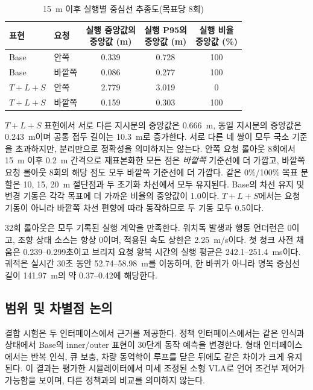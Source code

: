 \documentclass[letterpaper,conference]{IEEEtran}
\begin{document}
\begin{table}[!ht]
\caption{15~m 이후 실행별 중심선 추종도(목표당 8회)}
\label{tab:adherence}
\centering
\footnotesize
\setlength{\tabcolsep}{3.1pt}
\begin{tabular}{@{}llccc@{}}
\toprule
표현 & 요청 & \shortstack{실행 중앙값의\\중앙값 (m)} & \shortstack{실행 P95의\\중앙값 (m)} & \shortstack{실행 비율\\중앙값 (\%)} \\
\midrule
Base & 안쪽 & 0.339 & 0.728 & 100 \\
Base & 바깥쪽 & 0.086 & 0.277 & 100 \\
$T{+}L{+}S$ & 안쪽 & 2.779 & 3.019 & 0 \\
$T{+}L{+}S$ & 바깥쪽 & 0.159 & 0.303 & 100 \\
\bottomrule
\end{tabular}
\end{table}

$T{+}L{+}S$ 표현에서 서로 다른 지시문의 중앙값은 0.666~m, 동일 지시문의 중앙값은
0.243~m이며 공통 접두 길이는 10.3~m로 증가한다. 서로 다른 네 쌍이 모두 국소 기준을
초과하지만, 분리만으로 정확성을 의미하지는 않는다. 안쪽 요청 롤아웃 8회에서 15~m
이후 0.2~m 간격으로 재표본화한 모든 점은 \emph{바깥쪽} 기준선에 더 가깝고, 바깥쪽
요청 롤아웃 8회의 해당 점도 모두 바깥쪽 기준선에 더 가깝다. 같은 0\%/100\% 목표
분할은 10, 15, 20~m 절단점과 두 초기화 차선에서 모두 유지된다. Base의 차선 유지 및
변경 기동은 각각 목표에 더 가까운 비율의 중앙값이 1.0이다. $T{+}L{+}S$에서는 요청
기동이 아니라 바깥쪽 차선 편향에 따라 동작하므로 두 기동 모두 0.5이다.

32회 롤아웃은 모두 기록된 실행 계약을 만족한다. 워치독 발생과 행동 언더런은 0이고,
조향 상태 소스는 항상 0이며, 적용된 속도 상한은 2.25~m/s이다. 첫 청크 사전 채움은
0.239--0.299초이고 브리지 요청 왕복 시간의 실행 평균은 242.1--251.4~ms이다. 궤적은
실시간 30초 동안 52.74--58.98~m를 이동하며, 한 바퀴가 아니라 명목 중심선 길이
141.97~m의 약 0.37--0.42에 해당한다.

\subsection{범위 및 차별점 논의}
결합 시험은 두 인터페이스에서 근거를 제공한다. 정책 인터페이스에서는 같은 인식과
상태에서 Base의 inner/outer 표현이 30단계 동작 예측을 변경한다. 형태 인터페이스에서는
반복 인식, 큐 보충, 차량 동역학이 루프를 닫은 뒤에도 같은 차이가 크게 유지된다. 이
결과는 평가한 시뮬레이터에서 미세 조정된 소형 VLA로 언어 조건부 제어가 가능함을
보이며, 다른 정책과의 비교를 의미하지 않는다.
\end{document}
